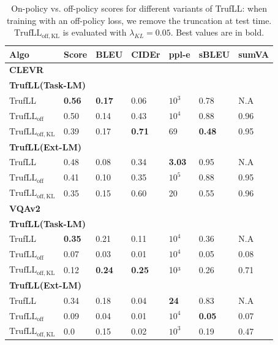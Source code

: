 \documentclass{article}
\newcommand{\algo}{TrufLL\xspace}
\begin{document}
\begin{table}[h!]
\caption{\small On-policy vs. off-policy scores for different variants of \algo: when training with an off-policy loss, we remove the truncation at test time.
$\mathrm{\algo}_{\mathrm{off,KL}}$ is evaluated with $\lambda_{KL}=0.05$. Best values are in bold.}
\label{table:abl:offpolicy_vs_onpolicy_sweep}
\small
\centering
\begin{tabular}{p{}|p{}|p{}p{}p{}|p{}p{}}
Algo & Score & BLEU & CIDEr & ppl-e & sBLEU & sumVA \\\toprule
\multicolumn{6}{l}{\textbf{CLEVR}}\\
\hline\hline
\multicolumn{4}{l}{\textbf{\algo(Task-LM)}} \\
\midrule
\algo & \textbf{0.56} & \textbf{0.17} & 0.06 & $10^3$ & 0.78 & N.A \\
$\mathrm{\algo}_{\mathrm{off}}$ & 0.50 & 0.14 & 0.43 & $10^4$ & 0.88 & 0.96 \\
$\mathrm{\algo}_{\mathrm{off,KL}}$ &0.39 & 0.17&\textbf{0.71} &69 &\textbf{0.48} & 0.95 \\
\midrule
\multicolumn{4}{l}{\textbf{\algo(Ext-LM)}} \\
\midrule
\algo & 0.48 & 0.08 & 0.34 & \textbf{3.03} & 0.95 & N.A \\
$\mathrm{\algo}_{\mathrm{off}}$ & 0.41 & 0.10 & 0.35 & $10^5$ & 0.88 & 0.95 \\
$\mathrm{\algo}_{\mathrm{off,KL}}$ & 0.35 & 0.15 & 0.60 & 20 & 0.55 & 0.96 \\ 
\toprule 
\multicolumn{6}{l}{\textbf{VQAv2}}  \\
\hline\hline
\multicolumn{4}{l}{\textbf{\algo(Task-LM)}} \\
\midrule
\algo & \textbf{0.35} & 0.21 & 0.11 & $10^4$ & 0.36 & N.A \\
$\mathrm{\algo}_{\mathrm{off}}$ & 0.07 & 0.03 & 0.01 & $10^4$ &  0.05 & 0.08 \\
$\mathrm{\algo}_{\mathrm{off,KL}}$ &  0.12 &  \textbf{0.24} &  \textbf{0.25} & 10³ &  0.26 & 0.71 \\
\midrule
\multicolumn{4}{l}{\textbf{\algo(Ext-LM)}} \\
\midrule
\algo & 0.34 & 0.18 & 0.04 & \textbf{24} & 0.83 & N.A \\
$\mathrm{\algo}_{\mathrm{off}}$ & 0.09 & 0.04 & 0.01 & $10^4$ & \textbf{0.05} & 0.07 \\
$\mathrm{\algo}_{\mathrm{off,KL}}$ & 0.0 & 0.15 &  0.02 & $10^3$ &  0.19 &  0.47 \\
\bottomrule
\end{tabular}
\end{table}
\end{document}
